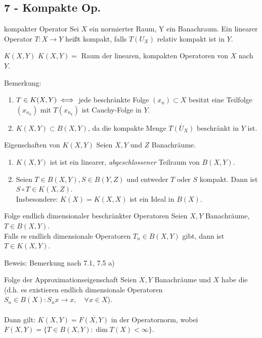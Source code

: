 \subsection*{7 - Kompakte Op.}

	\begin{karte}{kompakter Operator}
		Sei $X$ ein normierter Raum, Y ein Banachraum. Ein linearer Operator $T \colon X \rightarrow Y$ hei{\ss}t kompakt, falls $T(U_{X})$ relativ kompakt ist in $Y$.
	\end{karte}

	\begin{karte}{$K(X, Y)$}	
		$K(X, Y) =$ Raum der linearen, kompakten Operatoren von $X$ nach $Y$.
		
		Bemerkung:
		\begin{enumerate}[label=\alph*\upshape)]
			\item $T \in K(X, Y) \iff$ jede beschränkte Folge $(x_{n}) \subset X$ besitzt eine Teilfolge $(x_{n_{k}})$ mit $T(x_{n_{k}})$ ist Cauchy-Folge in $Y$.
			\item $K(X, Y) \subset B(X, Y)$, da die kompakte Menge $\overline{T(U_{X})}$ beschränkt in $Y$ ist.
		\end{enumerate}	
	\end{karte}

	\begin{karte}{Eigenschaften von $K(X, Y)$}		
		Seien $X, Y$ und $Z$ Banachräume.
		\begin{enumerate}[label=\alph*\upshape)]
			\item $K(X, Y)$ ist ist ein linearer, \textit{abgeschlossener} Teilraum von $B(X, Y)$.
			\item Seien $T \in B(X, Y), S \in B(Y, Z)$ und entweder $T$ oder $S$ kompakt. Dann ist $S \circ T \in K(X, Z)$. \\
			Insbesondere: $K(X) = K(X, X)$ ist ein Ideal in $B(X)$.
		\end{enumerate}
	\end{karte}

	\begin{karte}{Folge endlich dimensionaler beschränkter Operatoren}		
		Seien $X, Y$ Banachräume, $T \in B(X, Y)$. \\
		Falls es endlich dimensionale Operatoren $T_{n} \in B(X, Y)$ gibt, dann ist $T \in K(X, Y)$.
		
		Beweis:
			Bemerkung nach 7.1, 7.5 a)	
	\end{karte}

	\begin{karte}{Folge der Approximationseigenschaft}			
		Seien $X, Y$ Banachräume und $X$ habe die  (d.h. es existieren endlich dimensionale Operatoren $S_{n} \in B(X): S_{n} x \rightarrow x, \quad \forall x \in X$). \\ \\
		Dann gilt: $K(X, Y) = \overline{F(X, Y)}$ in der Operatornorm, wobei $F(X, Y) = \{ T \in B(X, Y): \dim T(X) < \infty \}$.
	\end{karte}
	
